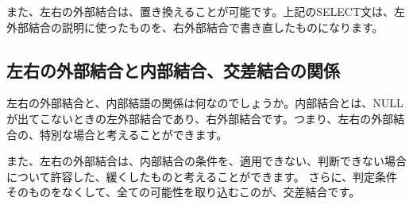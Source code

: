 また、左右の外部結合は、置き換えることが可能です。上記のSELECT文は、左外部結合の説明に使ったものを、右外部結合で書き直したものになります。

\subsection{左右の外部結合と内部結合、交差結合の関係}

左右の外部結合と、内部結語の関係は何なのでしょうか。内部結合とは、NULLが出てこないときの左外部結合であり、右外部結合です。つまり、左右の外部結合の、特別な場合と考えることができます。

また、左右の外部結合は、内部結合の条件を、適用できない、判断できない場合について許容した、緩くしたものと考えることができます。
さらに、判定条件そのものをなくして、全ての可能性を取り込むこのが、交差結合です。


